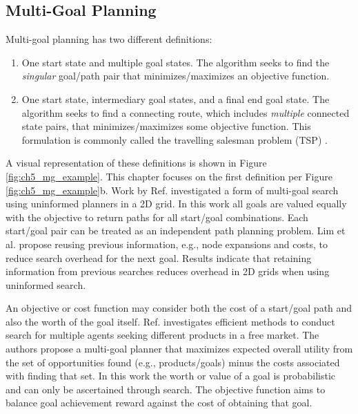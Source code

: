 \subsection{Multi-Goal Planning}\label{sec:ch5_multi_goal_bg}

Multi-goal planning has two different  definitions:
\begin{enumerate}
    \item One start state and multiple goal states. The algorithm seeks to find the \emph{singular} goal/path pair that minimizes/maximizes an objective function.
    \item One start state, intermediary goal states, and a final end goal state. The algorithm seeks to find a connecting route, which includes \emph{multiple} connected state pairs, that minimizes/maximizes some objective function. This formulation is commonly called the travelling salesman problem (TSP) \cite{saha_planning_2003}.
\end{enumerate}
A visual representation of these definitions is shown in Figure \ref{fig:ch5_mg_example}. This chapter focuses on the first definition per Figure \ref{fig:ch5_mg_example}b.  Work by Ref. \cite{lim_uninformed_2014} investigated a form of multi-goal search using uninformed planners in a 2D grid. In this work all goals are valued equally with the objective to return paths for all start/goal combinations. Each start/goal pair can be treated as an independent path planning problem. Lim et al. propose reusing previous information, e.g.,  node expansions and costs, to reduce search overhead for the next goal. Results indicate that retaining information from previous searches reduces overhead in 2D grids when using uninformed search.

An objective or cost function may consider both the cost of a start/goal path and also the worth of the goal itself. Ref. \cite{sarne_multi-goal_2010} investigates efficient methods to conduct search for multiple agents seeking different products in a free market.  The authors propose a multi-goal planner that maximizes expected overall utility from the set of opportunities found (e.g., products/goals) minus the costs associated with finding that set. In this work the worth or value of a goal is probabilistic and can only be ascertained through search. The objective function aims to balance goal achievement reward against the cost of obtaining that goal.


